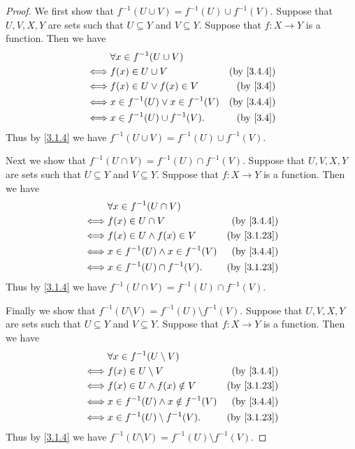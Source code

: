 \begin{proof}
  We first show that \(f^{-1}(U \cup V) = f^{-1}(U) \cup f^{-1}(V)\).
  Suppose that \(U, V, X, Y\) are sets such that \(U \subseteq Y\) and \(V \subseteq Y\).
  Suppose that \(f : X \to Y\) is a function.
  Then we have
  \begin{align*}
         & \forall x \in f^{-1}(U \cup V)                                  \\
    \iff & f(x) \in U \cup V                    & \text{(by \cref{3.4.4})} \\
    \iff & f(x) \in U \lor f(x) \in V           & \text{(by \cref{3.4})}   \\
    \iff & x \in f^{-1}(U) \lor x \in f^{-1}(V) & \text{(by \cref{3.4.4})} \\
    \iff & x \in f^{-1}(U) \cup f^{-1}(V).      & \text{(by \cref{3.4})}
  \end{align*}
  Thus by \cref{3.1.4} we have \(f^{-1}(U \cup V) = f^{-1}(U) \cup f^{-1}(V)\).

  Next we show that \(f^{-1}(U \cap V) = f^{-1}(U) \cap f^{-1}(V)\).
  Suppose that \(U, V, X, Y\) are sets such that \(U \subseteq Y\) and \(V \subseteq Y\).
  Suppose that \(f : X \to Y\) is a function.
  Then we have
  \begin{align*}
         & \forall x \in f^{-1}(U \cap V)                                    \\
    \iff & f(x) \in U \cap V                     & \text{(by \cref{3.4.4})}  \\
    \iff & f(x) \in U \land f(x) \in V           & \text{(by \cref{3.1.23})} \\
    \iff & x \in f^{-1}(U) \land x \in f^{-1}(V) & \text{(by \cref{3.4.4})}  \\
    \iff & x \in f^{-1}(U) \cap f^{-1}(V).       & \text{(by \cref{3.1.23})}
  \end{align*}
  Thus by \cref{3.1.4} we have \(f^{-1}(U \cap V) = f^{-1}(U) \cap f^{-1}(V)\).

  Finally we show that \(f^{-1}(U \setminus V) = f^{-1}(U) \setminus f^{-1}(V)\).
  Suppose that \(U, V, X, Y\) are sets such that \(U \subseteq Y\) and \(V \subseteq Y\).
  Suppose that \(f : X \to Y\) is a function.
  Then we have
  \begin{align*}
         & \forall x \in f^{-1}(U \setminus V)                                  \\
    \iff & f(x) \in U \setminus V                   & \text{(by \cref{3.4.4})}  \\
    \iff & f(x) \in U \land f(x) \notin V           & \text{(by \cref{3.1.23})} \\
    \iff & x \in f^{-1}(U) \land x \notin f^{-1}(V) & \text{(by \cref{3.4.4})}  \\
    \iff & x \in f^{-1}(U) \setminus f^{-1}(V).     & \text{(by \cref{3.1.23})}
  \end{align*}
  Thus by \cref{3.1.4} we have \(f^{-1}(U \setminus V) = f^{-1}(U) \setminus f^{-1}(V)\).
\end{proof}

